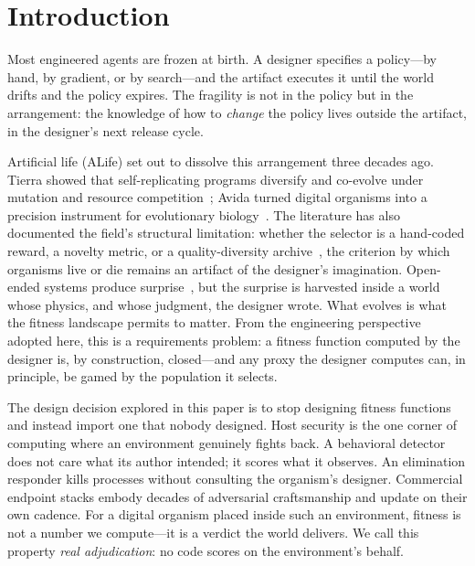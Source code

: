 \documentclass[11pt,a4paper]{article}
\begin{document}
\section{Introduction}
\label{sec:intro}

Most engineered agents are frozen at birth. A designer specifies a policy---by hand, by gradient, or by search---and the artifact executes it until the world drifts and the policy expires. The fragility is not in the policy but in the arrangement: the knowledge of how to \emph{change} the policy lives outside the artifact, in the designer's next release cycle.

Artificial life (ALife) set out to dissolve this arrangement three decades ago. Tierra showed that self-replicating programs diversify and co-evolve under mutation and resource competition~\cite{ray1991tierra}; Avida turned digital organisms into a precision instrument for evolutionary biology~\cite{ofria2004avida}. The literature has also documented the field's structural limitation: whether the selector is a hand-coded reward, a novelty metric, or a quality-diversity archive~\cite{lehman2011novelty,mouret2015mapelites,pugh2016qd}, the criterion by which organisms live or die remains an artifact of the designer's imagination. Open-ended systems produce surprise~\cite{wang2019poet,wang2020enhancedpoet}, but the surprise is harvested inside a world whose physics, and whose judgment, the designer wrote. What evolves is what the fitness landscape permits to matter. From the engineering perspective adopted here, this is a requirements problem: a fitness function computed by the designer is, by construction, closed---and any proxy the designer computes can, in principle, be gamed by the population it selects.

The design decision explored in this paper is to stop designing fitness functions and instead import one that nobody designed. Host security is the one corner of computing where an environment genuinely fights back. A behavioral detector does not care what its author intended; it scores what it observes. An elimination responder kills processes without consulting the organism's designer. Commercial endpoint stacks embody decades of adversarial craftsmanship and update on their own cadence. For a digital organism placed inside such an environment, fitness is not a number we compute---it is a verdict the world delivers. We call this property \emph{real adjudication}: no code scores on the environment's behalf.
\end{document}
